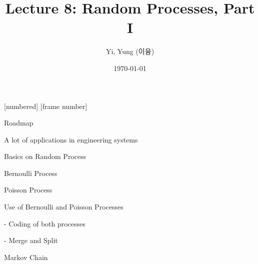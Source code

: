 

\csname\pdfmode\endcsname

{
  [numbered]
  [frame number]  %
}





\title[]{Lecture 8: Random Processes, Part I}
\author{Yi, Yung (이융)}
\date{\today}








\begin{frame}
  \titlepage
\end{frame}




\begin{frame}{Roadmap}

\plitemsep 0.1in

\bci
\item A lot of applications in engineering systems


\bigskip

\item Basics on Random Process

\medskip
\item Bernoulli Process
\item Poisson Process
\item Use of Bernoulli and Poisson Processes

- Coding of both processes

- Merge and Split

\medskip
\item Markov Chain

\eci

\end{frame}

